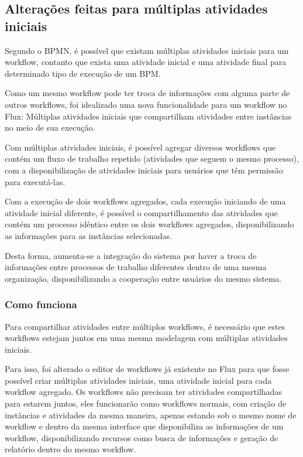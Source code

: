 \subsection{Alterações feitas para múltiplas atividades iniciais}

Segundo o BPMN, é possível que existam múltiplas atividades iniciais para um workflow, contanto que exista uma atividade inicial e uma atividade final para determinado tipo de execução de um BPM.

Como um mesmo workflow pode ter troca de informações com alguma parte de outros workflows, foi idealizado uma nova funcionalidade para um workflow no Flux: Múltiplas atividades iniciais que compartilham atividades entre instâncias no meio de sua execução.

Com múltiplas atividades iniciais, é possível agregar diversos workflows que contém um fluxo de trabalho repetido (atividades que seguem o mesmo processo), com a disponibilização de atividades iniciais para usuários que têm permissão para executá-las.

Com a execução de dois workflows agregados, cada execução iniciando de uma atividade inicial diferente, é possível o compartilhamento das atividades que contém um processo idêntico entre os dois workflows agregados, disponibilizando as informações para as instâncias selecionadas.

Desta forma, aumenta-se a integração do sistema por haver a troca de informações entre processos de trabalho diferentes dentro de uma mesma organização, disponibilizando a cooperação entre usuários do mesmo sistema.

\subsubsection{Como funciona}

Para compartilhar atividades entre múltiplos workflows, é necessário que estes workflows estejam juntos em uma mesma modelagem com múltiplas atividades iniciais.

Para isso, foi alterado o editor de workflows já existente no Flux para que fosse possível criar múltiplas atividades iniciais, uma atividade inicial para cada workflow agregado.
Os workflows não precisam ter atividades compartilhadas para estarem juntos, eles funcionarão como workflows normais, com criação de instâncias e atividades da mesma maneira, apenas estando sob o mesmo nome de workflow e dentro da mesma interface que disponibiliza as informações de um workflow, disponibilizando recursos como busca de informações e geração de relatório dentro do mesmo workflow.

